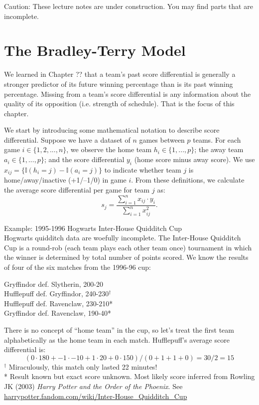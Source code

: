 \documentclass{article}
\begin{document}
\begin{framed}
  {\sc Caution:} These lecture notes are under construction. You may find parts that are incomplete.
\end{framed}

\setcounter{section}{2}
\section{\sc The Bradley-Terry Model}

  We learned in Chapter ?? that a team's past score differential is generally a stronger predictor of its future winning percentage than is its past winning percentage. Missing from a team's score differential is any information about the quality of its opposition (i.e. strength of schedule). That is the focus of this chapter.

  We start by introducing some mathematical notation to describe score differential. Suppose we have a dataset of $n$ games between $p$ teams. For each game $i \in \{1, 2, ..., n\}$, we observe the home team $h_i \in \{1, ..., p\}$; the away team $a_i \in \{1, ..., p\}$; and the score differential $y_i$ (home score minus away score). We use $x_{ij} = \{\mathbb{I}(h_i = j) - \mathbb{I}(a_i = j)\}$ to indicate whether team $j$ is home/away/inactive (+1/--1/0) in game $i$. From these definitions, we calculate the average score differential per game for team $j$ as:
  \begin{equation*}
    s_j = \frac{
      \sum_{i=1}^n x_{ij} \cdot y_i
    }{
      \sum_{i=1}^n x_{ij}^2
    }.
  \end{equation*}

  \begin{framed}
    {\sc Example:} 1995-1996 Hogwarts Inter-House Quidditch Cup\\
    Hogwarts quidditch data are woefully incomplete. The Inter-House Quidditch Cup is a round-rob (each team plays each other team once) tournament in which the winner is determined by total number of points scored. We know the results of four of the six matches from the 1996-96 cup:
    \begin{center}
      Gryffindor def. Slytherin, 200-20\\
      Hufflepuff def. Gryffindor, 240-230$^\dagger$\\
      Hufflepuff def. Ravenclaw, 230-210*\\
      Gryffindor def. Ravenclaw, 190-40*
    \end{center}
    There is no concept of ``home team'' in the cup, so let's treat the first team alphabetically as the home team in each match. Hufflepuff's average score differential is:
    $$ (0 \cdot 180 + -1 \cdot -10 + 1 \cdot 20 + 0 \cdot 150) / (0 + 1 + 1 + 0) = 30 / 2 = 15$$
    $^\dagger$ Miraculously, this match only lasted 22 minutes!\\
    * Result known but exact score unknown. Most likely score inferred from Rowling JK (2003) {\it Harry Potter and the Order of the Phoenix}. See \url{harrypotter.fandom.com/wiki/Inter-House_Quidditch_Cup}
  \end{framed}
\end{document}
